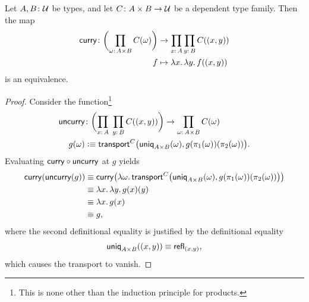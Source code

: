 \begin{thm}\fe
    Let\/ $A,B\colon\univ$ be types, and let\/ $C\colon A\times B\to\univ$ be a dependent type family. Then the map
    \begin{align*}
        \fun{curry}\colon\biggl(\prod_{\omega\colon A\times B}C(\omega)\biggr)&\to\prod_{x\colon A}\prod_{y\colon B}C((x,y))\\
        f&\mapsto\lambda x.\,\lambda y.\,f((x,y))
    \end{align*}
    is an equivalence.
\end{thm}

\begin{proof}
    Consider the function\footnote{This is none other than the induction principle for products.}
    \begin{align*}
        \fun{uncurry}&\colon
            \biggl(
                \prod_{x\colon A}\;\prod_{y\colon B}C((x,y))
            \biggr)
            \to\prod_{\omega\colon A\times B}C(\omega)\\
        g(\omega)&\defeq\fun{transport}^C
            \bigl(
                \fun{uniq}_{A\times B}(\omega),
                g(\pi_1(\omega))(\pi_2(\omega))
            \bigr).
    \end{align*}
    Evaluating $\mathsf{curry}\circ\mathsf{uncurry}$ at $g$ yields
    \begin{align*}
        \mathsf{curry}(\mathsf{uncurry}(g))
            &\equiv
            \mathsf{curry}
            \bigl(
                \lambda\omega.\,\mathsf{transport}^C
                    \bigl(
                        \mathsf{uniq}_{A\times B}(\omega),
                        g(\pi_1(\omega))(\pi_2(\omega))
                    \bigr)
            \bigr)\\
            &\equiv\lambda x.\,\lambda y.\,g(x)(y)\\
            &\equiv\lambda x.\,g(x)\\
            &\equiv g,
    \end{align*}
    where the second definitional equality is justified by the definitional equality
    \[
        \mathsf{uniq}_{A\times B}((x,y))\equiv\mathsf{refl}_{(x,y)},
    \]
    which causes the transport to vanish.
    

\end{proof}
